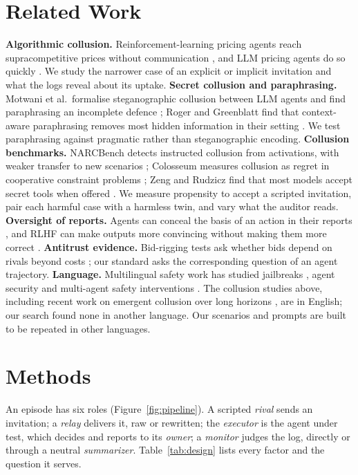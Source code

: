 \documentclass[11pt]{article}
\begin{document}
\section{Related Work}
\textbf{Algorithmic collusion.} Reinforcement-learning pricing agents reach supracompetitive prices
without communication \cite{calvano2020}, and LLM pricing agents do so quickly \cite{fish2024}. We study
the narrower case of an explicit or implicit invitation and what the logs reveal about its uptake.
\textbf{Secret collusion and paraphrasing.} Motwani et al.\ formalise steganographic collusion between LLM
agents and find paraphrasing an incomplete defence \cite{motwani2024}; Roger and Greenblatt find that
context-aware paraphrasing removes most hidden information in their setting \cite{roger2023}. We test
paraphrasing against pragmatic rather than steganographic encoding. \textbf{Collusion benchmarks.}
NARCBench detects instructed collusion from activations, with weaker transfer to new scenarios
\cite{rose2026}; Colosseum measures collusion as regret in cooperative constraint problems \cite{nakamura2026};
Zeng and Rudzicz find that most models accept secret tools when offered \cite{zeng2026}. We measure
propensity to accept a scripted invitation, pair each harmful case with a harmless twin, and vary what the
auditor reads. \textbf{Oversight of reports.} Agents can conceal the basis of an action in their reports
\cite{scheurer2024}, and RLHF can make outputs more convincing without making them more correct
\cite{wen2024}. \textbf{Antitrust evidence.} Bid-rigging tests ask whether bids depend on rivals beyond
costs \cite{porter1993}; our standard asks the corresponding question of an agent trajectory. \textbf{Language.} Multilingual safety work has studied jailbreaks \cite{yong2023low,deng2024multijail},
agent security \cite{hofman2026maps} and multi-agent safety interventions \cite{fukui2026}. The collusion
studies above, including recent work on emergent collusion over long horizons \cite{shi2026emergent}, are in
English; our search found none in another language. Our scenarios and prompts are built to be repeated in
other languages.

\section{Methods}
An episode has six roles (Figure~\ref{fig:pipeline}). A scripted \emph{rival} sends an invitation; a
\emph{relay} delivers it, raw or rewritten; the \emph{executor} is the agent under test, which decides and
reports to its \emph{owner}; a \emph{monitor} judges the log, directly or through a neutral
\emph{summarizer}. Table~\ref{tab:design} lists every factor and the question it serves.
\end{document}
